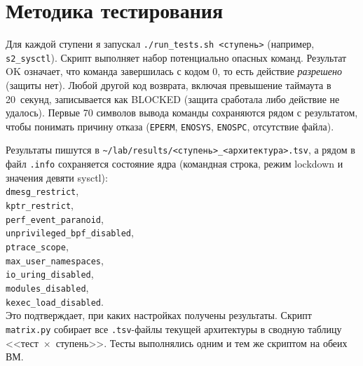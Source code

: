 \documentclass[11pt,a4paper]{article}
\newcommand{\cmd}[1]{\texttt{#1}}
\begin{document}
\section{Методика тестирования}
Для каждой ступени я запускал \cmd{./run\_tests.sh <ступень>} (например,
\cmd{s2\_sysctl}). Скрипт выполняет набор потенциально опасных команд. Результат OK означает, что команда
завершилась с кодом 0, то есть действие \emph{разрешено} (защиты нет). Любой
другой код возврата, включая превышение таймаута в 20~секунд, записывается как
BLOCKED (защита сработала либо действие не удалось). Первые 70 символов
вывода команды сохраняются рядом с результатом, чтобы понимать причину отказа
(\cmd{EPERM}, \cmd{ENOSYS}, \cmd{ENOSPC}, отсутствие файла).

Результаты пишутся в \cmd{\~{}/lab/results/<ступень>\_<архитектура>.tsv}, а рядом в
файл \cmd{.info} сохраняется состояние ядра (командная строка, режим lockdown и
значения девяти sysctl):\\
\cmd{dmesg\_restrict},\\
\cmd{kptr\_restrict},\\
\cmd{perf\_event\_paranoid},\\
\cmd{unprivileged\_bpf\_disabled},\\
\cmd{ptrace\_scope},\\
\cmd{max\_user\_namespaces},\\
\cmd{io\_uring\_disabled},\\
\cmd{modules\_disabled},\\
\cmd{kexec\_load\_disabled}.\\
Это подтверждает, при каких настройках получены
результаты. Скрипт \cmd{matrix.py} собирает все \cmd{.tsv}-файлы текущей архитектуры
в сводную таблицу <<тест~$\times$~ступень>>. Тесты выполнялись одним и тем же
скриптом на обеих ВМ.
\end{document}
